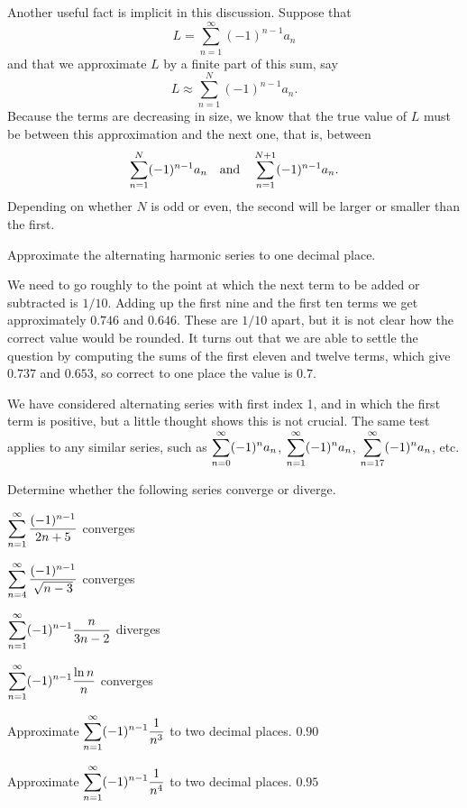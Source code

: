 Another useful fact is implicit in this discussion. Suppose that 
$$L=\sum_{n=1}^\infty (-1)^{n-1} a_n$$
and that we approximate $L$ by a finite part of this sum, say
$$L\approx \sum_{n=1}^N (-1)^{n-1} a_n.$$
Because the terms are decreasing in size, we know that the true value
of $L$ must be between this approximation and the next one, that is,
between 
$$
  \sum_{n=1}^N (-1)^{n-1} a_n \quad \hbox{and}\quad
  \sum_{n=1}^{N+1} (-1)^{n-1} a_n.
$$
Depending on whether $N$ is odd or even, the second will be larger or
smaller than the first.

\example
Approximate the alternating harmonic series to one decimal place.

We need to go roughly to the point at which the next term to be added
or subtracted is $1/10$. Adding up the first nine and the first ten
terms we get approximately $0.746$ and $0.646$. These are $1/10$
apart, but it is not clear how the correct value would be rounded. It
turns out that we are able to settle the question by computing the
sums of the first eleven and twelve terms, which give
$0.737$ and $0.653$, so correct to one place the value is $0.7$.
\endexample

We have considered alternating series with first index 1, and in which
the first term is positive, but a little thought shows this is not
crucial. The same test applies to any similar series, such as
$\displaystyle\sum_{n=0}^\infty (-1)^n a_n$, $\displaystyle\sum_{n=1}^\infty (-1)^n a_n$, 
$\displaystyle\sum_{n=17}^\infty (-1)^n a_n$, etc.

\exercises

Determine whether the following series converge or diverge.

\twocol

\exercise $\displaystyle\sum_{n=1}^\infty {(-1)^{n-1}\over 2n+5}$
\answer converges
\endanswer
\endexercise

\exercise $\displaystyle\sum_{n=4}^\infty {(-1)^{n-1}\over \sqrt{n-3}}$
\answer converges
\endanswer
\endexercise

\exercise $\displaystyle\sum_{n=1}^\infty (-1)^{n-1}{n\over 3n-2}$
\answer diverges
\endanswer
\endexercise

\exercise $\displaystyle\sum_{n=1}^\infty (-1)^{n-1}{\ln n\over n}$
\answer converges
\endanswer
\endtwocol

\msk
\endexercise

\exercise Approximate $\displaystyle\sum_{n=1}^\infty (-1)^{n-1}{1\over n^3}$ to
two decimal places.
\answer $0.90$
\endanswer
\endexercise

\exercise Approximate $\displaystyle\sum_{n=1}^\infty (-1)^{n-1}{1\over n^4}$ to
two decimal places. 
\answer $0.95$
\endanswer
\endexercise

\endexercises

